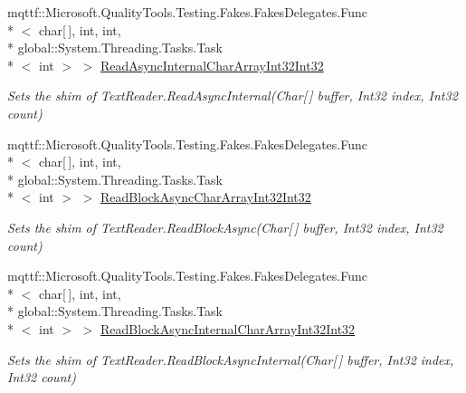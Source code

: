 \begin{DoxyCompactItemize}
mqttf\-::\-Microsoft.\-Quality\-Tools.\-Testing.\-Fakes.\-Fakes\-Delegates.\-Func\\*
$<$ char\mbox{[}$\,$\mbox{]}, int, int, \\*
global\-::\-System.\-Threading.\-Tasks.\-Task\\*
$<$ int $>$ $>$ \hyperlink{class_system_1_1_i_o_1_1_fakes_1_1_shim_text_reader_acd60c65af91032033b97ce9dbbd2d136}{Read\-Async\-Internal\-Char\-Array\-Int32\-Int32}
\begin{DoxyCompactList}\small\item\em Sets the shim of Text\-Reader.\-Read\-Async\-Internal(\-Char\mbox{[}$\,$\mbox{]} buffer, Int32 index, Int32 count)\end{DoxyCompactList}\item 
mqttf\-::\-Microsoft.\-Quality\-Tools.\-Testing.\-Fakes.\-Fakes\-Delegates.\-Func\\*
$<$ char\mbox{[}$\,$\mbox{]}, int, int, \\*
global\-::\-System.\-Threading.\-Tasks.\-Task\\*
$<$ int $>$ $>$ \hyperlink{class_system_1_1_i_o_1_1_fakes_1_1_shim_text_reader_a89be003501a65a2ed2c0d59c3f0c3761}{Read\-Block\-Async\-Char\-Array\-Int32\-Int32}
\begin{DoxyCompactList}\small\item\em Sets the shim of Text\-Reader.\-Read\-Block\-Async(\-Char\mbox{[}$\,$\mbox{]} buffer, Int32 index, Int32 count)\end{DoxyCompactList}\item 
mqttf\-::\-Microsoft.\-Quality\-Tools.\-Testing.\-Fakes.\-Fakes\-Delegates.\-Func\\*
$<$ char\mbox{[}$\,$\mbox{]}, int, int, \\*
global\-::\-System.\-Threading.\-Tasks.\-Task\\*
$<$ int $>$ $>$ \hyperlink{class_system_1_1_i_o_1_1_fakes_1_1_shim_text_reader_aefb2b6e20dffecea3eff00f3e9c43c18}{Read\-Block\-Async\-Internal\-Char\-Array\-Int32\-Int32}
\begin{DoxyCompactList}\small\item\em Sets the shim of Text\-Reader.\-Read\-Block\-Async\-Internal(\-Char\mbox{[}$\,$\mbox{]} buffer, Int32 index, Int32 count)\end{DoxyCompactList}\item 

\end{DoxyCompactItemize}
